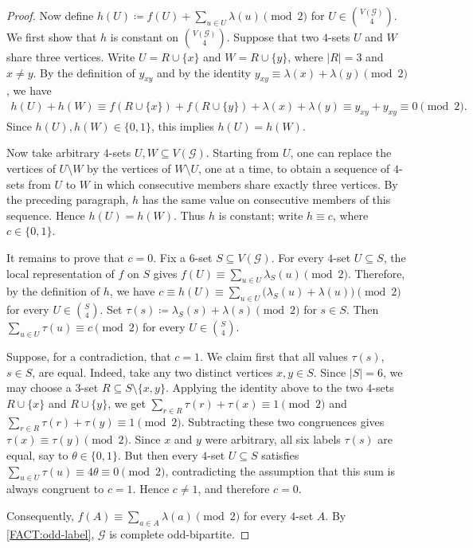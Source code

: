 \documentclass[10pt,a4paper]{article}
\theoremstyle{plain}
\theoremstyle{definition}
\begin{document}
\begin{proof}
Now define $h(U)\coloneqq f(U)+\sum_{u\in U}\lambda(u)\pmod 2$ for $U\in\binom{V(\mathcal G)}{4}$.
We first show that $h$ is constant on $\binom{V(\mathcal G)}4$.  Suppose that two
$4$-sets $U$ and $W$ share three vertices.  Write $U=R\cup\{x\}$ and $W=R\cup\{y\}$, where $|R|=3$ and $x\ne y$.  By the definition of $y_{xy}$ and by the identity
$y_{xy}\equiv \lambda(x)+\lambda(y)\pmod 2$, we have
\[
\begin{aligned}
h(U)+h(W)
\equiv f(R\cup\{x\})+f(R\cup\{y\})+\lambda(x)+\lambda(y) 
\equiv y_{xy}+y_{xy}
\equiv 0 \pmod 2.
\end{aligned}
\]
Since $h(U),h(W)\in\{0,1\}$, this implies $h(U)=h(W)$.

Now take arbitrary $4$-sets $U,W\subseteq V(\mathcal G)$.  Starting from $U$, one can
replace the vertices of $U\setminus W$ by the vertices of $W\setminus U$, one at a
time, to obtain a sequence of $4$-sets from $U$ to $W$ in which consecutive members
share exactly three vertices.  By the preceding paragraph, $h$ has the same value on
consecutive members of this sequence.  Hence $h(U)=h(W)$.  Thus $h$ is constant; write
$h\equiv c$, where $c\in\{0,1\}$.

It remains to prove that $c=0$.  Fix a $6$-set $S\subseteq V(\mathcal G)$.  For every
$4$-set $U\subseteq S$, the local representation of $f$ on $S$ gives
$f(U)\equiv \sum_{u\in U}\lambda_S(u)\pmod 2$.  Therefore, by the definition of $h$, we have $c\equiv h(U)\equiv \sum_{u\in U}\bigl(\lambda_S(u)+\lambda(u)\bigr)\pmod 2$ for every $U\in\binom S4$.  Set $\tau(s)\coloneqq \lambda_S(s)+\lambda(s)\pmod 2$ for $s\in S$.  Then $\sum_{u\in U}\tau(u)\equiv c\pmod 2$ for every $U\in\binom S4$.

Suppose, for a contradiction, that $c=1$.  We claim first that all values $\tau(s)$,
$s\in S$, are equal.  Indeed, take any two distinct vertices $x,y\in S$.  Since
$|S|=6$, we may choose a $3$-set $R\subseteq S\setminus\{x,y\}$.  Applying the
identity above to the two $4$-sets $R\cup\{x\}$ and $R\cup\{y\}$, we get $\sum_{r\in R}\tau(r)+\tau(x)\equiv 1\pmod 2$ and $\sum_{r\in R}\tau(r)+\tau(y)\equiv 1\pmod 2$.  Subtracting these two congruences gives $\tau(x)\equiv \tau(y)\pmod 2$.
Since $x$ and $y$ were arbitrary, all six labels $\tau(s)$ are equal, say to
$\theta\in\{0,1\}$.  But then every $4$-set $U\subseteq S$ satisfies
$\sum_{u\in U}\tau(u)\equiv 4\theta\equiv 0\pmod 2$, contradicting the assumption that this sum is always congruent to $c=1$.  Hence $c\ne 1$,
and therefore $c=0$.

Consequently, $f(A)\equiv \sum_{a\in A}\lambda(a)\pmod 2$ for every $4$-set $A$.  By \cref{FACT:odd-label}, $\mathcal G$ is complete odd-bipartite.
\end{proof}
\end{document}
